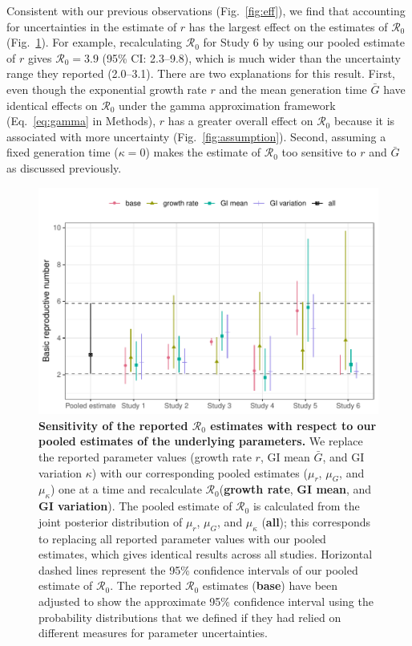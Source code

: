 \documentclass[12pt]{article}
\newcommand{\eref}[1]{Eq.~\ref{eq:#1}}
\newcommand{\fref}[1]{Fig.~\ref{fig:#1}}
\newcommand{\Rx}[1]{\ensuremath{{\mathcal R}_{#1}}}
\newcommand{\Ro}{\Rx{0}\xspace}
\begin{document}
Consistent with our previous observations (\fref{eff}),
we find that accounting for uncertainties in the estimate of $r$ has the largest effect on the estimates of \Ro (\fref{R0}).
For example, recalculating \Ro for Study 6 by using our pooled estimate of $r$ gives $\mathcal R_0 = 3.9$ (95\% CI: 2.3--9.8), which is much wider than the uncertainty range they reported (2.0--3.1).
There are two explanations for this result.
First, even though the exponential growth rate $r$ and the mean generation time $\bar G$ have identical effects on \Ro under the gamma approximation framework (\eref{gamma} in Methods),
$r$ has a greater overall effect on \Ro because it is associated with more uncertainty (\fref{assumption}).
Second, assuming a fixed generation time ($\kappa=0$) makes the estimate of \Ro too sensitive to $r$ and $\bar G$ as discussed previously.

\begin{figure}[!th]
\includegraphics[width=\textwidth]{compare_R0.pdf}
\caption{
\textbf{Sensitivity of the reported \Ro estimates with respect to our pooled estimates of the underlying parameters.}
We replace the reported parameter values (growth rate $r$, GI mean $\bar G$, and GI variation $\kappa$) with our corresponding pooled estimates ($\mu_r$, $\mu_G$, and $\mu_\kappa$) one at a time and recalculate \Ro (\textbf{growth rate}, \textbf{GI mean}, and \textbf{GI variation}).
The pooled estimate of \Ro is calculated from the joint posterior distribution of $\mu_r$, $\mu_G$, and $\mu_\kappa$ (\textbf{all});
this corresponds to replacing all reported parameter values with our pooled estimates, which gives identical results across all studies.
Horizontal dashed lines represent the 95\% confidence intervals of our pooled estimate of \Ro.
The reported \Ro estimates (\textbf{base}) have been adjusted to show the approximate 95\% confidence interval using the probability distributions that we defined if they had relied on different measures for parameter uncertainties.
}
\label{fig:R0}
\end{figure}
\end{document}
